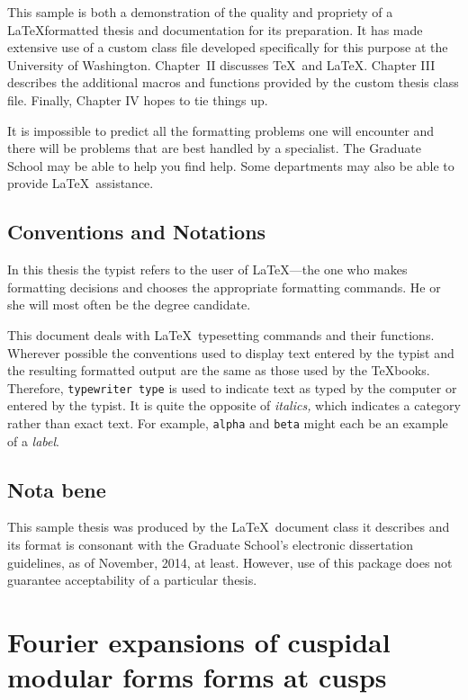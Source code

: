 \documentclass [11pt, proquest] {uwthesis}[2015/03/03]
\begin{document}
This sample is both a demonstration of the quality and
propriety of a \LaTeX formatted thesis and  
documentation for its preparation.
It has made extensive use of a custom class file
developed specifically for this purpose
at the University of Washington.  Chapter~II discusses
\TeX\ and \LaTeX.
Chapter III describes the additional macros and functions
provided by the custom thesis class file.  Finally, Chapter IV hopes to tie things up.
 
It is 
impossible to predict all the formatting problems one will encounter
and there will be problems that are best handled
by a specialist.  
The Graduate School may be able to help you find help.
Some departments may also be able to provide \LaTeX\ assistance.
 
 
\section{Conventions and Notations}
 
In this thesis the typist
refers to the user of \LaTeX---the one who
makes formatting decisions and chooses the appropriate
formatting commands.
He or she will most often be the degree candidate.
 
This document deals with \LaTeX\ typesetting commands and their
functions.  Wherever possible the conventions used to display
text entered by the typist and the resulting formatted output
are the same as those used by the \TeX books.
Therefore, {\tt typewriter type} is used to indicate text
as typed by the computer
or entered by the typist.
It is quite the opposite of {\it italics,} which indicates
a category rather than exact text.  For example,
{\tt alpha} and {\tt beta} might each be an example of a {\it label}.
 
 
\section{Nota bene}
 
This sample thesis was produced by the \LaTeX\ document class it describes
and its format is consonant with the Graduate School's electronic dissertation guidelines,
as of November, 2014, at least.
However, use of this package does not guarantee acceptability
of a particular thesis.
 
 

\chapter{Fourier expansions of cuspidal modular forms forms at cusps}
\end{document}
